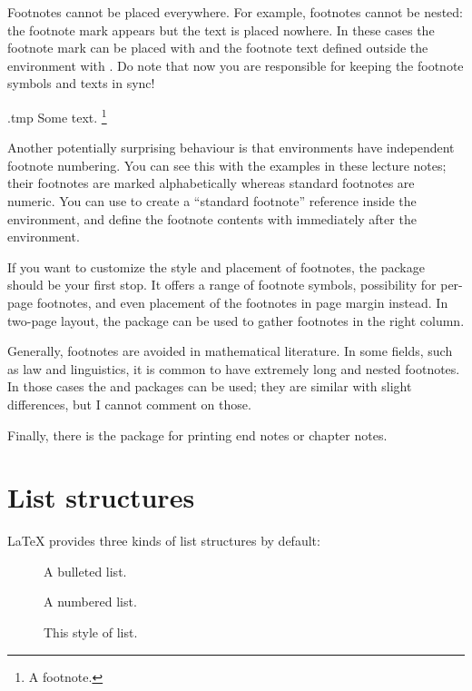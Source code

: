 Footnotes cannot be placed everywhere.
For example, footnotes cannot be nested:
the footnote mark appears but the text is placed nowhere.
In these cases the footnote mark can be placed with 
and the footnote text defined outside the environment with .
Do note that now you are responsible for keeping the footnote symbols and texts in sync!
%
\begin{VerbatimOut}{\jobname.tmp}
\renewcommand{\footnotemark}{\mpfootnotemark} %
Some text.%
\footnote{A footnote.\footnotemark}
\end{VerbatimOut}
\ShowExample[2]

Another potentially surprising behaviour is that  environments
have independent footnote numbering.
You can see this with the examples in these lecture notes;
their footnotes are marked alphabetically whereas standard footnotes are numeric.
You can use  to create a ``standard footnote'' reference inside the environment,
and define the footnote contents with  immediately after the environment.

If you want to customize the style and placement of footnotes,
the  package should be your first stop.
It offers a range of footnote symbols, possibility for per-page footnotes,
and even placement of the footnotes in page margin instead.
In two-page layout, the  package can be used to gather
footnotes in the right column.

Generally, footnotes are avoided in mathematical literature.
In some fields, such as law and linguistics,
it is common to have extremely long and nested footnotes.
In those cases the  and  packages can be used;
they are similar with slight differences, but I cannot comment on those.

Finally, there is the  package for printing end notes or chapter notes.


%
%
%
\section{List structures}

\LaTeX{} provides three kinds of list structures by default:
\begin{description}
\item[] A bulleted list.
\item[] A numbered list.
\item[] This style of list.
\end{description}

